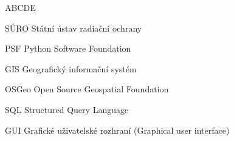 
\begin{seznamzkratek}{ABCDE}

	      {SÚRO}
	      {Státní ústav radiační ochrany}
	      
		  {PSF}
	      {Python Software Foundation}

	      {GIS}
	      {Geografický informační systém}

	      {OSGeo}
	      {Open Source Geospatial Foundation}

	      {SQL}
	      {Structured Query Language}
	      
	      {GUI}
	      {Grafické uživatelské rozhraní (Graphical user interface)}

\end{seznamzkratek}
